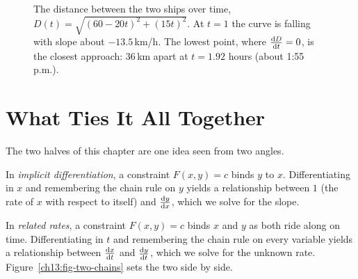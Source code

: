 \begin{figure}[htbp]
\centering
{}
\caption{The distance between the two ships over time, $D(t)=\sqrt{(60-20t)^2+(15t)^2}$. At $t=1$ the
curve is falling with slope about $-13.5$\,km/h. The lowest point, where $\frac{\mathrm{d} D}{\mathrm{d} t}=0$, is the closest
approach: $36$\,km apart at $t=1.92$ hours (about 1:55\,p.m.).}
\label{ch13:fig-ships-distance}
\end{figure}

\section{What Ties It All Together}
\label{ch13:synthesis}

The two halves of this chapter are one idea seen from two angles.

In \emph{implicit differentiation}, a constraint $F(x,y)=c$ binds $y$ to $x$. Differentiating in $x$
and remembering the chain rule on $y$ yields a relationship between $1$ (the rate of $x$ with respect
to itself) and $\frac{\mathrm{d} y}{\mathrm{d} x}$, which we solve for the slope.

In \emph{related rates}, a constraint $F(x,y)=c$ binds $x$ and $y$ as both ride along on time.
Differentiating in $t$ and remembering the chain rule on every variable yields a relationship between
$\frac{\mathrm{d} x}{\mathrm{d} t}$ and $\frac{\mathrm{d} y}{\mathrm{d} t}$, which we solve for the unknown rate.
Figure~\ref{ch13:fig-two-chains} sets the two side by side.

